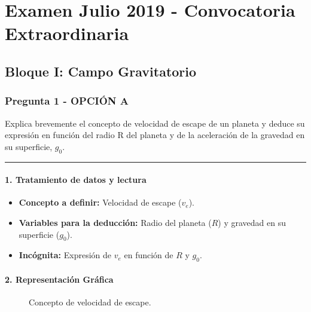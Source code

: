 \chapter{Examen Julio 2019 - Convocatoria Extraordinaria}
\label{chap:2019_jul_ext}

\section{Bloque I: Campo Gravitatorio}
\label{sec:grav_2019_jul_ext}

\subsection{Pregunta 1 - OPCIÓN A}
\label{subsec:1A_2019_jul_ext}

\begin{cajaenunciado}
Explica brevemente el concepto de velocidad de escape de un planeta y deduce su expresión en función del radio R del planeta y de la aceleración de la gravedad en su superficie, $g_0$.
\end{cajaenunciado}
\hrule

\subsubsection*{1. Tratamiento de datos y lectura}
\begin{itemize}
    \item \textbf{Concepto a definir:} Velocidad de escape ($v_e$).
    \item \textbf{Variables para la deducción:} Radio del planeta ($R$) y gravedad en su superficie ($g_0$).
    \item \textbf{Incógnita:} Expresión de $v_e$ en función de $R$ y $g_0$.
\end{itemize}

\subsubsection*{2. Representación Gráfica}
\begin{figure}[H]
    \centering
    \caption{Concepto de velocidad de escape.}
\end{figure}

